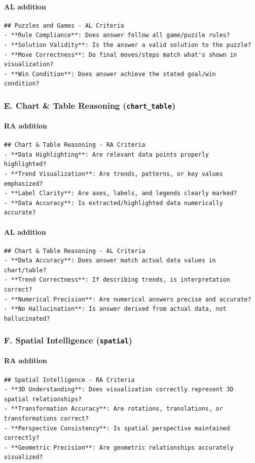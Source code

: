 \documentclass{article}
\theoremstyle{plain}
\theoremstyle{definition}
\theoremstyle{remark}
\begin{document}
\paragraph{AL addition}
\begin{verbatim}
## Puzzles and Games - AL Criteria
- **Rule Compliance**: Does answer follow all game/puzzle rules?
- **Solution Validity**: Is the answer a valid solution to the puzzle?
- **Move Correctness**: Do final moves/steps match what's shown in visualization?
- **Win Condition**: Does answer achieve the stated goal/win condition?
\end{verbatim}

\subsubsection*{E. Chart \& Table Reasoning (\texttt{chart\_table})}
\paragraph{RA addition}
\begin{verbatim}
## Chart & Table Reasoning - RA Criteria
- **Data Highlighting**: Are relevant data points properly highlighted?
- **Trend Visualization**: Are trends, patterns, or key values emphasized?
- **Label Clarity**: Are axes, labels, and legends clearly marked?
- **Data Accuracy**: Is extracted/highlighted data numerically accurate?
\end{verbatim}
\paragraph{AL addition}
\begin{verbatim}
## Chart & Table Reasoning - AL Criteria
- **Data Accuracy**: Does answer match actual data values in chart/table?
- **Trend Correctness**: If describing trends, is interpretation correct?
- **Numerical Precision**: Are numerical answers precise and accurate?
- **No Hallucination**: Is answer derived from actual data, not hallucinated?
\end{verbatim}

\subsubsection*{F. Spatial Intelligence (\texttt{spatial})}
\paragraph{RA addition}
\begin{verbatim}
## Spatial Intelligence - RA Criteria
- **3D Understanding**: Does visualization correctly represent 3D spatial relationships?
- **Transformation Accuracy**: Are rotations, translations, or transformations correct?
- **Perspective Consistency**: Is spatial perspective maintained correctly?
- **Geometric Precision**: Are geometric relationships accurately visualized?
\end{verbatim}
\end{document}
